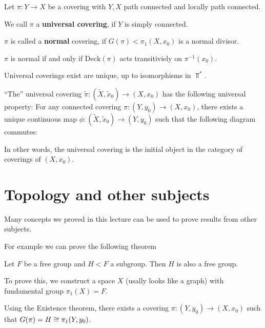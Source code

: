 \begin{dfn}[]
Let $\pi: Y \to  X$ be a covering with $Y,X$ path connected and locally path connected.

We call $\pi$ a \textbf{universal covering}, if $Y$ is simply connected.

$\pi$ is called a \textbf{normal} covering, if $G(\pi) < \pi_1(X,x_0)$ is a normal divisor.
\end{dfn}

\begin{rem}[]
  $\pi$ is normal if and only if $\text{Deck}(\pi)$ acts transitiviely on $\pi^{-1}(x_0)$.

  Universal coverings exist are unique, up to isomorphisms in $\Top^{\ast}$.

  ``The'' universal covering $\tilde{\pi}: (\tilde{X},\tilde{x}_0) \to (X,x_0)$ has the following universal property:
  For any connected covering $\pi:(Y,y_0) \to  (X,x_0)$, there exists a unique continuous map
  $\phi: (\tilde{X},\tilde{x}_0) \to  (Y,y_0)$ such that the following diagram commutes:

  \begin{center}
  \end{center}
  In other words, the universal covering is the initial object in the category of coverings of $(X,x_0)$.
\end{rem}



\section{Topology and other subjects}
Many concepts we proved in this lecture can be used to prove results from other subjects.

For example we can prove the following theorem
\begin{thm}[]
Let $F$ be a free group and $H < F$ a subgroup. Then $H$ is also a free group.
\end{thm}
To prove this, we construct a space $X$ (usally looks like a graph) with fundamental group $\pi_1(X) = F$.

Using the Existence theorem, there exists a covering $\pi:(Y,y_0) \to  (X,x_0)$ such that $G(\pi) = H \cong \pi_1(Y,y_0)$.

